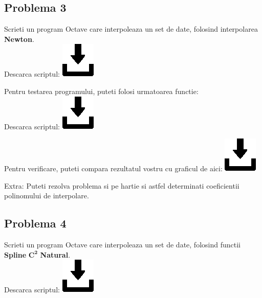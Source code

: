 \documentclass{article}
\begin{document}
\subsection{Problema 3}
\tab Scrieti un program Octave care interpoleaza un set de date, folosind interpolarea \textbf{Newton}.\\
\tabto{0.5cm} Descarca scriptul:
\href{https://github.com/Iulian277/Interpolation/blob/main/Newton/newton.m}{\includegraphics[scale=0.35]{download_button}}
\vspace{0.25cm}

Pentru testarea programului, puteti folosi urmatoarea functie:\\
\tabto{0.5cm} Descarca scriptul:
\href{https://github.com/Iulian277/Interpolation/blob/main/Newton/test_newton.m}{\includegraphics[scale=0.35]{download_button}}


Pentru verificare, puteti compara rezultatul vostru cu graficul de aici: \href{https://github.com/Iulian277/Interpolation/blob/main/Newton/newton_res.svg}{\includegraphics[scale=0.35]{download_button}}

Extra: Puteti rezolva problema si pe hartie si astfel determinati coeficientii polinomului de interpolare.\pagebreak


\subsection{Problema 4}
\tab Scrieti un program Octave care interpoleaza un set de date, folosind functii \textbf{Spline} $\mathbf{C^2}$ \textbf{Natural}.\\
\tabto{0.5cm} Descarca scriptul:
\href{https://github.com/Iulian277/Interpolation/blob/main/Spline\%20C2\%20Natural/splineC2_natural.m}{\includegraphics[scale=0.35]{download_button}}
\vspace{0.25cm}
\end{document}
